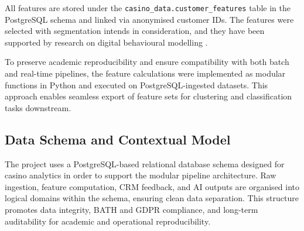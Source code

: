\documentclass[12pt,a4paper]{report}
\begin{document}
All features are stored under the \texttt{casino\_data.customer\_features} table in the PostgreSQL schema and linked via anonymised customer IDs. The features were selected with segmentation intends in consideration, and they have been supported by research on digital behavioural modelling \citep{Desiata2024b, Omike2022a, randomforest, kmeans}.

To preserve academic reproducibility and ensure compatibility with both batch and real-time pipelines, the feature calculations were implemented as modular functions in Python and executed on PostgreSQL-ingested datasets. This approach enables seamless export of feature sets for clustering and classification tasks downstream.

\subsection{Data Schema and Contextual Model}

The project uses a PostgreSQL-based relational database schema designed for casino analytics in order to support the modular pipeline architecture. Raw ingestion, feature computation, CRM feedback, and AI outputs are organised into logical domains within the schema, ensuring clean data separation. This structure promotes data integrity,  BATH and GDPR compliance, and long-term auditability for academic and operational reproducibility.
\end{document}
